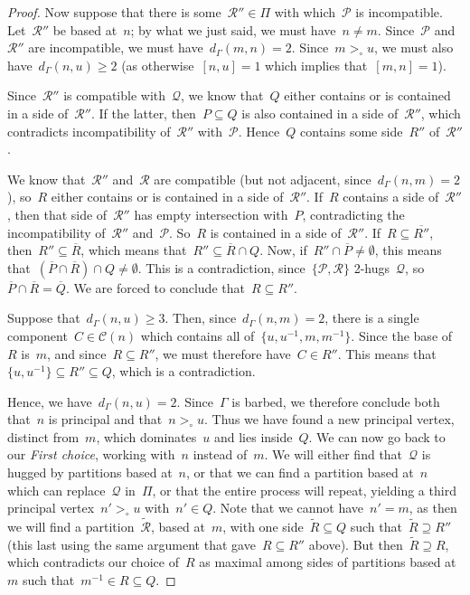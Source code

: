 \documentclass[11pt]{amsart}
\theoremstyle{definition}
\theoremstyle{definition}
\theoremstyle{definition}
\theoremstyle{definition}
\newcommand{\calC}{\mathcal{C}}
\newcommand{\calQ}{\mathcal{Q}}
\newcommand{\calP}{\mathcal{P}} %
\newcommand{\calR}{\mathcal{R}} %
\begin{document}
\begin{proof}
    Now suppose that there is some~$\calR'' \in \Pi$ with which~$\calP$ is incompatible. Let~$\calR''$ be based at~$n$; by what we just said, we must have~$n \neq m$. Since~$\calP$ and~$\calR''$ are incompatible, we must have~$d_\Gamma(m, n) = 2$. Since~$m >_\circ u$, we must also have~$d_\Gamma(n, u) \geq 2$ (as otherwise~$[n, u] = 1$ which implies that~$[m, n] = 1$). 
    
    Since~$\calR''$ is compatible with~$\calQ$, we know that~$Q$ either contains or is contained in a side of~$\calR''$. If the latter, then~$P \subseteq Q$ is also contained in a side of~$\calR''$, which contradicts incompatibility of~$\calR''$ with~$\calP$. Hence~$Q$ contains some side~$R''$ of~$\calR''$.

    We know that~$\calR''$ and~$\calR$ are compatible (but not adjacent, since~$d_\Gamma(n, m) = 2$), so~$R$ either contains or is contained in a side of~$\calR''$. If~$R$ contains a side of~$\calR''$, then that side of~$\calR''$ has empty intersection with~$P$, contradicting the incompatibility of~$\calR''$ and~$\calP$. So~$R$ is contained in a side of~$\calR''$. If~$R \subseteq \overline{R''}$, then~$R'' \subseteq \overline{R}$, which means that~$R'' \subseteq \overline{R} \cap Q$. Now, if~$R'' \cap \overline{P} \neq \emptyset$, this means that~$(\overline{P} \cap \overline{R}) \cap Q \neq \emptyset$. This is a contradiction, since~$\{\calP, \calR\}$ 2-hugs~$\calQ$, so~$\overline{P} \cap \overline{R} = \overline{Q}$. We are forced to conclude that~$R \subseteq R''$.

    Suppose that~$d_\Gamma(n, u) \geq 3$. Then, since~$d_\Gamma(n, m) = 2$, there is a single component~$C \in \calC(n)$ which contains all of~$\{u, u^{-1}, m, m^{-1}\}$. Since the base of~$R$ is~$m$, and since~$R \subseteq R''$, we must therefore have~$C \in R''$. This means that~$\{u, u^{-1}\} \subseteq R'' \subseteq Q$, which is a contradiction. 

    Hence, we have~$d_\Gamma(n, u) = 2$. Since~$\Gamma$ is barbed, we therefore conclude both that~$n$ is principal and that~$n >_\circ u$. Thus we have found a new principal vertex, distinct from~$m$, which dominates~$u$ and lies inside~$Q$. We can now go back to our \emph{First choice}, working with~$n$ instead of~$m$. We will either find that~$\calQ$ is hugged by partitions based at~$n$, or that we can find a partition based at~$n$ which can replace~$\calQ$ in~$\Pi$, or that the entire process will repeat, yielding a third principal vertex~$n' >_\circ u$ with~$n' \in Q$. Note that we cannot have~$n' = m$, as then we will find a partition~$\widetilde{\calR}$, based at~$m$, with one side~$\widetilde{R} \subseteq Q$ such that~$\widetilde{R} \supseteq R''$ (this last using the same argument that gave~$R \subseteq R''$ above). But then~$\widetilde{R} \supseteq R$, which contradicts our choice of~$R$ as maximal among sides of partitions based at~$m$ such that~$m^{-1} \in R \subseteq Q$. 


\end{proof}
\end{document}
